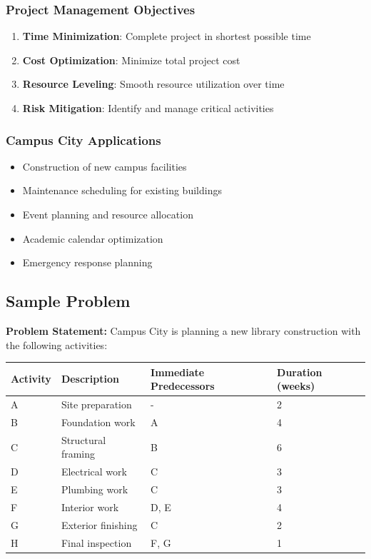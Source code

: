 \documentclass[
  letterpaper,
  DIV=11,
  numbers=noendperiod]{scrreprt}
\providecommand{\tightlist}{%
  \setlength{\itemsep}{0pt}\setlength{\parskip}{0pt}}
\begin{document}
\subsubsection{Project Management
Objectives}\label{project-management-objectives}

\begin{enumerate}
\def\labelenumi{\arabic{enumi}.}
\tightlist
\item
  \textbf{Time Minimization}: Complete project in shortest possible time
\item
  \textbf{Cost Optimization}: Minimize total project cost
\item
  \textbf{Resource Leveling}: Smooth resource utilization over time
\item
  \textbf{Risk Mitigation}: Identify and manage critical activities
\end{enumerate}

\subsubsection{Campus City Applications}\label{campus-city-applications}

\begin{itemize}
\tightlist
\item
  Construction of new campus facilities
\item
  Maintenance scheduling for existing buildings
\item
  Event planning and resource allocation
\item
  Academic calendar optimization
\item
  Emergency response planning
\end{itemize}

\subsection{Sample Problem}\label{sample-problem-7}

\textbf{Problem Statement:} Campus City is planning a new library
construction with the following activities:

\begin{longtable}[]{@{}llll@{}}
\toprule\noalign{}
Activity & Description & Immediate Predecessors & Duration (weeks) \\
\midrule\noalign{}
\endhead
\bottomrule\noalign{}
\endlastfoot
A & Site preparation & - & 2 \\
B & Foundation work & A & 4 \\
C & Structural framing & B & 6 \\
D & Electrical work & C & 3 \\
E & Plumbing work & C & 3 \\
F & Interior work & D, E & 4 \\
G & Exterior finishing & C & 2 \\
H & Final inspection & F, G & 1 \\
\end{longtable}
\end{document}

